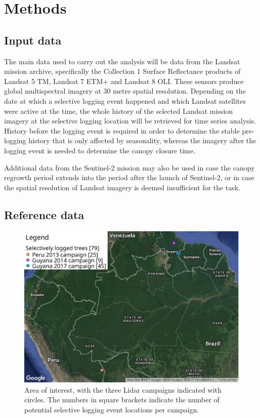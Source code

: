 \documentclass[a4paper,10pt]{article}
\begin{document}
\section{Methods}

\subsection{Input data}

The main data used to carry out the analysis will be data from the Landsat mission archive, specifically the Collection 1 Surface Reflectance products of Landsat 5 \ac{TM}, Landsat 7 \ac{ETM+} and Landsat 8 \ac{OLI}. These sensors produce global multispectral imagery at 30 metre spatial resolution. Depending on the date at which a selective logging event happened and which Landsat satellites were active at the time, the whole history of the selected Landsat mission imagery at the selective logging location will be retrieved for time series analysis. History before the logging event is required in order to determine the stable pre-logging history that is only affected by seasonality, whereas the imagery after the logging event is needed to determine the canopy closure time.

Additional data from the Sentinel-2 mission may also be used in case the canopy regrowth period extends into the period after the launch of Sentinel-2, or in case the spatial resolution of Landsat imagery is deemed insufficient for the task.

\subsection{Reference data}

\begin{figure}
  \centering
  \includegraphics[width=\textwidth]{proposal-figures/AOI}
  \caption{Area of interest, with the three Lidar campaigns indicated with circles. The numbers in square brackets indicate the number of potential selective logging event locations per campaign.}
  \label{fig-aoi}
\end{figure}
\end{document}
